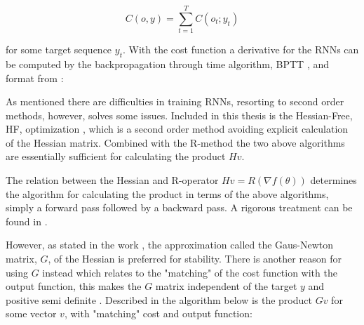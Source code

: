 \[C(o, y) = \sum_{t=1}^{T}C(o_t; y_t)\]

for some target sequence $y_t$. With the cost function a derivative for the RNNs can be computed by the backpropagation through time algorithm, BPTT \cite{RNN1}, and format from \cite{suts}:

\begin{algorithmic}[1]
    \EndFor
    \State {}
\end{algorithmic}

As mentioned there are difficulties in training RNNs, resorting to second order methods, however, solves some issues. Included in this thesis is the Hessian-Free, HF, optimization \cite{suts}, which is a second order method avoiding explicit calculation of the Hessian matrix. Combined with the R-method the two above algorithms are essentially sufficient for calculating the product $Hv$. 

The relation between the Hessian and R-operator $Hv = R(\nabla f(\theta))$ determines the algorithm for calculating the product in terms of the above algorithms, simply a forward pass followed by a backward pass. A rigorous treatment can be found in \cite{suts}.

However, as stated in the work \cite{suts}, the approximation called the Gaus-Newton matrix, \(G\), of the Hessian is preferred for stability. There is another reason for using $G$ instead which relates to the "matching" of the cost function with the output function, this makes the $G$ matrix independent of the target $y$ and positive semi definite \cite{Martens2012}. Described in the algorithm below is the product \(Gv\) for some vector $v$, with "matching" cost and output function:

\begin{algorithmic}[1]
    \EndFor
    \EndFor
    \State {}
\end{algorithmic}

